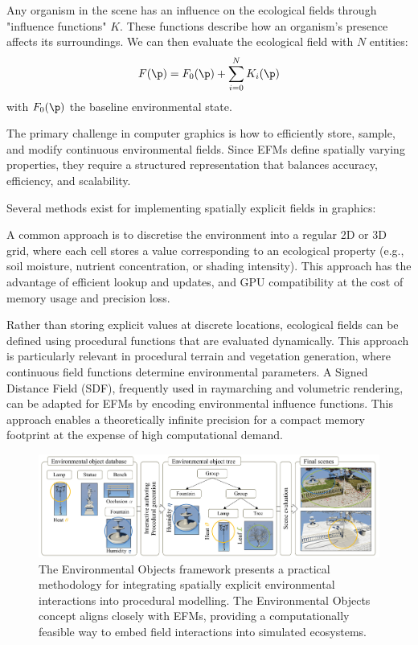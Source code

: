 Any organism in the scene has an influence on the ecological fields through "influence functions" $K$. These functions describe how an organism's presence affects its surroundings. We can then evaluate the ecological field with $N$ entities:
\begin{align}
\label{eq:env-obj-eco-field-computation}
F(\p) = F_0(\p) + \sum_{i=0}^{N}{K_i(\p)}
\end{align}
with $F_0(\p)$ the baseline environmental state.

The primary challenge in computer graphics is how to efficiently store, sample, and modify continuous environmental fields. Since EFMs define spatially varying properties, they require a structured representation that balances accuracy, efficiency, and scalability.

Several methods exist for implementing spatially explicit fields in graphics:
\begin{Itemize}
    \Item{} A common approach is to discretise the environment into a regular 2D or 3D grid, where each cell stores a value corresponding to an ecological property (e.g., soil moisture, nutrient concentration, or shading intensity). This approach has the advantage of efficient lookup and updates, and GPU compatibility at the cost of memory usage and precision loss.

    \Item{} Rather than storing explicit values at discrete locations, ecological fields can be defined using procedural functions that are evaluated dynamically. This approach is particularly relevant in procedural terrain and vegetation generation, where continuous field functions determine environmental parameters. A Signed Distance Field (SDF), frequently used in raymarching and volumetric rendering, can be adapted for EFMs by encoding environmental influence functions. This approach enables a theoretically infinite precision for a compact memory footprint at the expense of high computational demand.
\end{Itemize}


\begin{figure}
\includegraphics[]{env-objs-Grosbellet2016.png}
\caption{The Environmental Objects framework \cite{Grosbellet2016} presents a practical methodology for integrating spatially explicit environmental interactions into procedural modelling. The Environmental Objects concept aligns closely with EFMs, providing a computationally feasible way to embed field interactions into simulated ecosystems.}
\label{fig:env-obj-teaser-grosbellet2016}
\end{figure}

